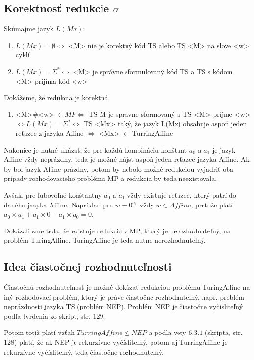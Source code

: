 \documentclass[10pt]{article}
\begin{document}
\subsection*{Korektnosť redukcie $\sigma$}
Skúmajme jazyk $L(Mx)$:
\begin{enumerate}
    \item $L(Mx) = \emptyset \iff$ <M> nie je korektný kód TS alebo TS <M> na slove <w> cyklí 
    \item $L(Mx) = \Sigma^* \iff$ <M> je správne sformulovaný kód TS a TS s kódom <M> prijíma kód <w>
\end{enumerate}

Dokážeme, že redukcia je korektná.
\begin{enumerate}
    \item <M>\#<w> $\in MP \iff$ TS M je správne sformovaný a TS <M> príjme <w> $\iff L(Mx) =
        \Sigma^* \iff$ TS <Mx> taký, že jazyk L(Mx) obsahuje aspoň jeden reťazec z jazyka Affine
        $\iff$ <Mx> $\in$ TurringAffine
\end{enumerate}

Nakoniec je nutné ukázať, že pre každú kombináciu konštant $a_0$ a $a_1$ je jazyk Affine vždy
neprázdny, teda je možné nájsť aspoň jeden reťazec jazyka Affine. Ak by bol jazyk Affine prázdny,
potom by nebolo možné redukciou vyjadriť oba prípady rozhodovacieho problému MP a redukcia by teda
neexistovala. 

Avšak, pre ľubovoľné konštantny $a_0$ a $a_1$ vždy existuje reťazec, ktorý patrí do daného jazyka Affine.
Napríklad pre $w = 0^{a_1}$ vždy $w
\in Affine$, pretože platí $a_0 \times a_1 + a_1 \times 0 - a_1\times a_0 = 0$.

Dokázali sme teda, že existuje redukcia z MP, ktorý je nerozhodnuteľný, na problém TuringAffine.
TuringAffine je teda nutne nerozhodnuteľný.
\subsection*{Idea čiastočnej rozhodnuteľnosti}
Čiastočnú rozhodnuteľnosť je možné dokázať redukciou problému TuringAffine na iný rozhodovací
problém, ktorý je práve čiastočne rozhodnuteľný, napr. problém neprázdnosti jazyka TS (problém NEP). 
Problém NEP je čiastočne vyčísliteľný podľa tvrdenia zo skript, str. 129. 

Potom totiž platí vzťah $TurringAffine \leq NEP$ a podla vety $6.3.1$ (skripta, str. 128) platí, že
ak NEP je rekurzívne vyčísliteľný, potom aj TurringAffine je rekurzívne vyčísliteľný, teda čiastočne
rozhodnuteľný. 
\end{document}
